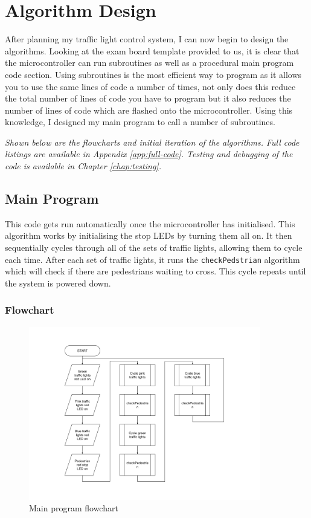 \chapter {Algorithm Design}

After planning my traffic light control system, I can now begin to design the algorithms. Looking at the exam board template provided to us, it is clear that the microcontroller can run subroutines as well as a procedural main program code section. \newline
Using subroutines is the most efficient way to program as it allows you to use the same lines of code a number of times, not only does this reduce the total number of lines of code you have to program but it also reduces the number of lines of code which are flashed onto the microcontroller. Using this knowledge, I designed my main program to call a number of subroutines. \newline

\noindent \textit{Shown below are the flowcharts and initial iteration of the algorithms. Full code listings are available in Appendix \ref{app:full-code}. Testing and debugging of the code is available in Chapter \ref{chap:testing}.}


\section{Main Program}
This code gets run automatically once the microcontroller has initialised. \newline
\noindent This algorithm works by initialising the stop LEDs by turning them all on. It then sequentially cycles through all of the sets of traffic lights, allowing them to cycle each time. After each set of traffic lights, it runs the \verb|checkPedstrian| algorithm which will check if there are pedestrians waiting to cross. This cycle repeats until the system is powered down.
\subsection*{Flowchart}
\begin{figure}[H]
    \centering
    \includegraphics[width=0.9\textwidth]{images/flowchart-main.png}
    \caption{Main program flowchart}
    \label{fig:flowchart-main}
\end{figure}
